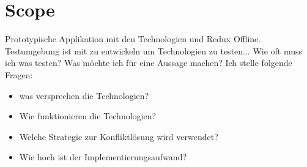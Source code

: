 %
%
\section{Scope}
Prototypische Applikation mit den Technologien  und Redux Offline. \\
Testumgebung ist mit zu entwickeln um Technologien zu testen...  Wie oft muss ich was testen? Was möchte ich für eine Aussage machen? Ich stelle folgende Fragen:
\begin{itemize}
  \item was versprechen die Technologien?
  \item Wie funktionieren die Technologien?
  \item Welche Strategie zur Konfliktlösung wird verwendet?
  \item Wie hoch ist der Implementierungsaufwand?
\end{itemize}
%
%
